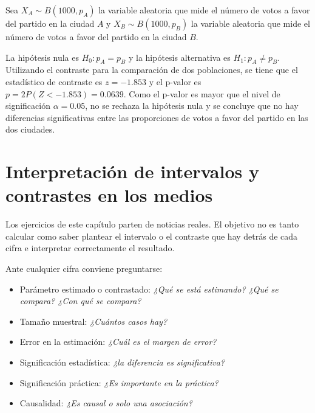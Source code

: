\documentclass[
  spanish,
  a4paper,
]{scrreport}
\providecommand{\tightlist}{%
  \setlength{\itemsep}{0pt}\setlength{\parskip}{0pt}}
\theoremstyle{definition}
\theoremstyle{remark}
\begin{document}
\begin{tcolorbox}[enhanced jigsaw, arc=.35mm, bottomrule=.15mm, bottomtitle=1mm, breakable, colback=white, colbacktitle=quarto-callout-tip-color!10!white, colframe=quarto-callout-tip-color-frame, coltitle=black, left=2mm, leftrule=.75mm, opacityback=0, opacitybacktitle=0.6, rightrule=.15mm, title=\textcolor{quarto-callout-tip-color}{\faLightbulb}\hspace{0.5em}{Solución}, titlerule=0mm, toprule=.15mm, toptitle=1mm]

Sea \(X_A\sim B(1000,p_A)\) la variable aleatoria que mide el número de
votos a favor del partido en la ciudad \(A\) y \(X_B\sim B(1000,p_B)\)
la variable aleatoria que mide el número de votos a favor del partido en
la ciudad \(B\).

La hipótesis nula es \(H_0: p_A=p_B\) y la hipótesis alternativa es
\(H_1: p_A\neq p_B\). Utilizando el contraste para la comparación de dos
poblaciones, se tiene que el estadístico de contraste es \(z=-1.853\) y
el p-valor es \(p =2 P(Z<-1.853) = 0.0639\). Como el p-valor es mayor
que el nivel de significación \(\alpha = 0.05\), no se rechaza la
hipótesis nula y se concluye que no hay diferencias significativas entre
las proporciones de votos a favor del partido en las dos ciudades.

\end{tcolorbox}


\chapter{Interpretación de intervalos y contrastes en los
medios}\label{interpretaciuxf3n-de-intervalos-y-contrastes-en-los-medios}

Los ejercicios de este capítulo parten de noticias reales. El objetivo
no es tanto calcular como saber plantear el intervalo o el contraste que
hay detrás de cada cifra e interpretar correctamente el resultado.

Ante cualquier cifra conviene preguntarse:

\begin{itemize}
\tightlist
\item
  Parámetro estimado o contrastado: \emph{¿Qué se está estimando? ¿Qué
  se compara? ¿Con qué se compara?}
\item
  Tamaño muestral: \emph{¿Cuántos casos hay?}
\item
  Error en la estimación: \emph{¿Cuál es el margen de error?}
\item
  Significación estadística: \emph{¿la diferencia es significativa?}
\item
  Significación práctica: \emph{¿Es importante en la práctica?}
\item
  Causalidad: \emph{¿Es causal o solo una asociación?}
\end{itemize}
\end{document}

